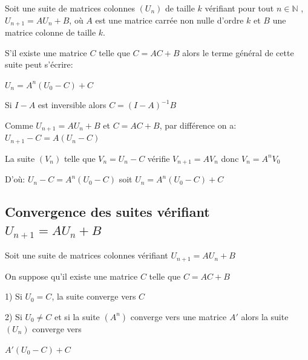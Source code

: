 \documentclass[french]{book}
\begin{document}
\begin{prop}


Soit une suite de matrices colonnes $(U_{n})$ de taille $k$ vérifiant pour tout $n \in \mathbb{N}$ , $U_{n+1}=AU_{n}+B$, où $A$ est une matrice carrée non nulle d'ordre $k$ et $B$ une matrice colonne de taille $k$.

S'il existe une matrice $C$ telle que $C=AC+B$ alors le terme général de cette suite peut s'écrire:

\begin{center}
$\boxed{U_{n}=A^{n}(U_{0}-C)+C}$
\end{center}

\end{prop}

\begin{rem}
Si $I-A$ est inversible alors $C=(I-A)^{-1}B$
\end{rem}
 
\begin{demo}
 
 Comme  $U_{n+1}=AU_{n}+B$ et $C=AC+B$, par différence on a: $U_{n+1}-C=A(U_{n}-C)$
 
 La suite $(V_{n})$ telle que $V_{n}=U_{n}-C$ vérifie $V_{n+1}=AV_{n}$ donc $V_{n}=A^{n}V_{0}$
 
 D'où: $U_{n}-C=A^{n}(U_{0}-C)$ soit $U_{n}=A^{n}(U_{0}-C)+C$
 
\end{demo} 

\subsection{Convergence des suites vérifiant $U_{n+1}=AU_{n}+B$}
 
 Soit une suite de matrices colonnes vérifiant $U_{n+1}=AU_{n}+B$
 
 On suppose qu'il existe une matrice $C$ telle que $C=AC+B$
 
 1) Si $U_{0}=C$, la suite converge vers $C$
 
 2) Si $U_{0}\neq C$ et si la suite $(A^{n})$ converge vers une matrice $A'$ alors la suite $(U_{n})$ converge vers
 
 \begin{center}
 $A'(U_{0}-C)+C$
 \end{center}
 
 
\begin{demo}
\vspace{3cm}
\end{demo}
 
\end{document}
